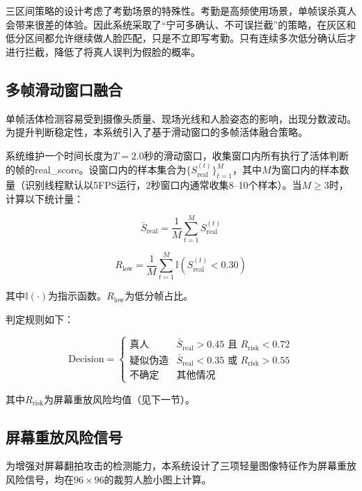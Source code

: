 三区间策略的设计考虑了考勤场景的特殊性。考勤是高频使用场景，单帧误杀真人会带来很差的体验。因此系统采取了``宁可多确认、不可误拦截''的策略，在灰区和低分区间都允许继续做人脸匹配，只是不立即写考勤。只有连续多次低分确认后才进行拦截，降低了将真人误判为假脸的概率。

\subsection{多帧滑动窗口融合}

单帧活体检测容易受到摄像头质量、现场光线和人脸姿态的影响，出现分数波动。为提升判断稳定性，本系统引入了基于滑动窗口的多帧活体融合策略。

系统维护一个时间长度为$T = 2.0$秒的滑动窗口，收集窗口内所有执行了活体判断的帧的real\_score。设窗口内的样本集合为$\{S_{\text{real}}^{(t)}\}_{t=1}^{M}$，其中$M$为窗口内的样本数量（识别线程默认以5FPS运行，2秒窗口内通常收集8--10个样本）。当$M \geq 3$时，计算以下统计量：

\begin{equation}
    \bar{S}_{\text{real}} = \frac{1}{M} \sum_{t=1}^{M} S_{\text{real}}^{(t)}
\end{equation}

\begin{equation}
    R_{\text{low}} = \frac{1}{M} \sum_{t=1}^{M} \mathbb{I}(S_{\text{real}}^{(t)} < 0.30)
\end{equation}

其中$\mathbb{I}(\cdot)$为指示函数。$R_{\text{low}}$为低分帧占比。

判定规则如下：

\begin{equation}
    \text{Decision} =
    \begin{cases}
        \text{真人} & \bar{S}_{\text{real}} > 0.45 \text{ 且 } R_{\text{risk}} < 0.72 \\
        \text{疑似伪造} & \bar{S}_{\text{real}} < 0.35 \text{ 或 } R_{\text{risk}} > 0.55 \\
        \text{不确定} & \text{其他情况}
    \end{cases}
\end{equation}

其中$R_{\text{risk}}$为屏幕重放风险均值（见下一节）。

\subsection{屏幕重放风险信号}

为增强对屏幕翻拍攻击的检测能力，本系统设计了三项轻量图像特征作为屏幕重放风险信号，均在$96 \times 96$的裁剪人脸小图上计算。

